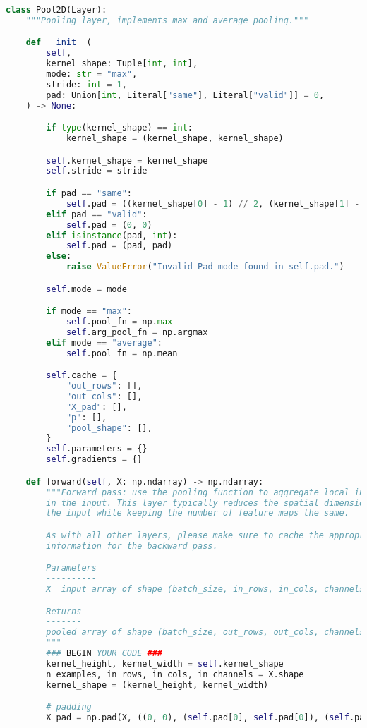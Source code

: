 \begin{lstlisting}[language=Python]
class Pool2D(Layer):
    """Pooling layer, implements max and average pooling."""

    def __init__(
        self,
        kernel_shape: Tuple[int, int],
        mode: str = "max",
        stride: int = 1,
        pad: Union[int, Literal["same"], Literal["valid"]] = 0,
    ) -> None:

        if type(kernel_shape) == int:
            kernel_shape = (kernel_shape, kernel_shape)

        self.kernel_shape = kernel_shape
        self.stride = stride

        if pad == "same":
            self.pad = ((kernel_shape[0] - 1) // 2, (kernel_shape[1] - 1) // 2)
        elif pad == "valid":
            self.pad = (0, 0)
        elif isinstance(pad, int):
            self.pad = (pad, pad)
        else:
            raise ValueError("Invalid Pad mode found in self.pad.")

        self.mode = mode

        if mode == "max":
            self.pool_fn = np.max
            self.arg_pool_fn = np.argmax
        elif mode == "average":
            self.pool_fn = np.mean

        self.cache = {
            "out_rows": [],
            "out_cols": [],
            "X_pad": [],
            "p": [],
            "pool_shape": [],
        }
        self.parameters = {}
        self.gradients = {}

    def forward(self, X: np.ndarray) -> np.ndarray:
        """Forward pass: use the pooling function to aggregate local information
        in the input. This layer typically reduces the spatial dimensionality of
        the input while keeping the number of feature maps the same.

        As with all other layers, please make sure to cache the appropriate
        information for the backward pass.

        Parameters
        ----------
        X  input array of shape (batch_size, in_rows, in_cols, channels)

        Returns
        -------
        pooled array of shape (batch_size, out_rows, out_cols, channels)
        """
        ### BEGIN YOUR CODE ###
        kernel_height, kernel_width = self.kernel_shape
        n_examples, in_rows, in_cols, in_channels = X.shape
        kernel_shape = (kernel_height, kernel_width)

        # padding
        X_pad = np.pad(X, ((0, 0), (self.pad[0], self.pad[0]), (self.pad[1], self.pad[1]), (0, 0)), mode='constant')


\end{lstlisting}
